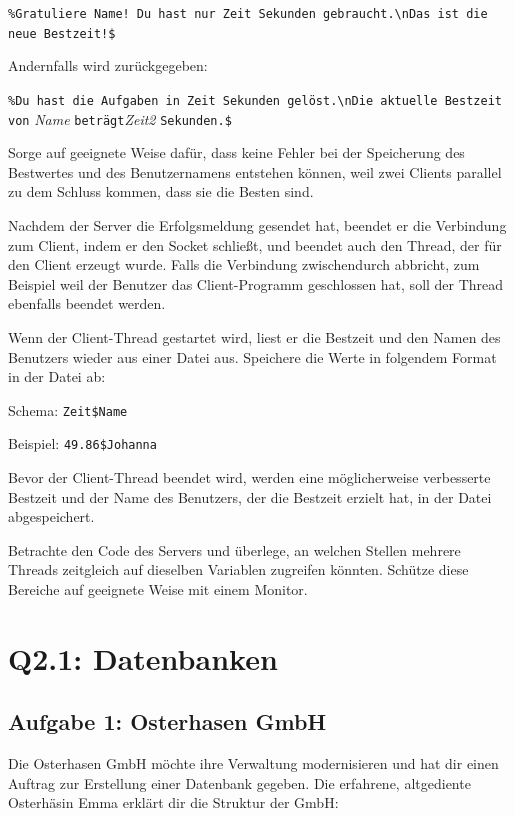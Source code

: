 \lstinline|%Gratuliere Name! Du hast nur Zeit Sekunden gebraucht.\nDas ist die neue Bestzeit!$|

Andernfalls wird zurückgegeben:

\lstinline|%Du hast die Aufgaben in Zeit Sekunden gelöst.\nDie aktuelle Bestzeit von| 
\emph{Name} \lstinline|beträgt|\linebreak \emph{Zeit2} \lstinline|Sekunden.$|

Sorge auf geeignete Weise dafür, dass keine Fehler bei der Speicherung des
Bestwertes und des Benutzernamens entstehen können, weil zwei Clients parallel
zu dem Schluss kommen, dass sie die Besten sind.

Nachdem der Server die Erfolgsmeldung gesendet hat, beendet er die Verbindung
zum Client, indem er den Socket schließt, und beendet auch den Thread, der für
den Client erzeugt wurde. Falls die Verbindung zwischendurch abbricht, zum
Beispiel weil der Benutzer das Client-Programm geschlossen hat, soll der Thread
ebenfalls beendet werden.

Wenn der Client-Thread gestartet wird, liest er die Bestzeit und den Namen des
Benutzers wieder aus einer Datei aus. Speichere die Werte in folgendem Format in
der Datei ab:

Schema: \lstinline|Zeit$Name|	

Beispiel: \lstinline|49.86$Johanna|

Bevor der Client-Thread beendet wird, werden eine möglicherweise verbesserte
Bestzeit und der Name des Benutzers, der die Bestzeit erzielt hat, in der Datei
abgespeichert.

Betrachte den Code des Servers und überlege, an welchen Stellen mehrere Threads
zeitgleich auf dieselben Variablen zugreifen könnten. Schütze diese Bereiche
auf geeignete Weise mit einem Monitor.


\section{Q2.1: Datenbanken}

\subsection{Aufgabe 1: Osterhasen GmbH}

Die Osterhasen GmbH möchte ihre Verwaltung modernisieren und hat dir einen
Auftrag zur Erstellung einer Datenbank gegeben. Die erfahrene, altgediente
Osterhäsin Emma erklärt dir die Struktur der GmbH:

